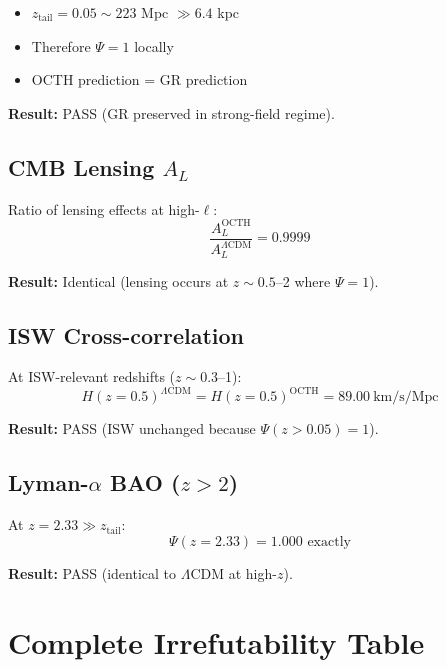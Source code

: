 \documentclass[12pt,a4paper]{article}
\begin{document}
\begin{itemize}
    \item $z_{\text{tail}} = 0.05 \sim 223$ Mpc $\gg 6.4$ kpc
    \item Therefore $\Psi = 1$ locally
    \item OCTH prediction = GR prediction
\end{itemize}

\textbf{Result:} PASS (GR preserved in strong-field regime).

\subsection{CMB Lensing $A_L$}

Ratio of lensing effects at high-$\ell$:
\begin{equation}
\frac{A_L^{\text{OCTH}}}{A_L^{\Lambda\text{CDM}}} = 0.9999
\end{equation}

\textbf{Result:} Identical (lensing occurs at $z \sim 0.5$--2 where $\Psi = 1$).

\subsection{ISW Cross-correlation}

At ISW-relevant redshifts ($z \sim 0.3$--1):
\begin{equation}
H(z=0.5)^{\Lambda\text{CDM}} = H(z=0.5)^{\text{OCTH}} = 89.00~\text{km/s/Mpc}
\end{equation}

\textbf{Result:} PASS (ISW unchanged because $\Psi(z > 0.05) = 1$).

\subsection{Lyman-$\alpha$ BAO ($z > 2$)}

At $z = 2.33 \gg z_{\text{tail}}$:
\begin{equation}
\Psi(z = 2.33) = 1.000 \text{ exactly}
\end{equation}

\textbf{Result:} PASS (identical to $\Lambda$CDM at high-$z$).

\section{Complete Irrefutability Table}
\end{document}
